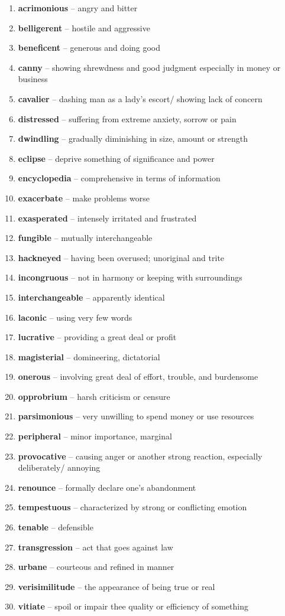 \begin{enumerate}[wide,labelindent=0pt]
\item \textbf{acrimonious} -- angry and bitter
\item \textbf{belligerent} -- hostile and aggressive
\item \textbf{beneficent} -- generous and doing good
\item \textbf{canny} -- showing shrewdness and good judgment especially in money or business
\item \textbf{cavalier} -- dashing man as a lady's escort/ showing lack of concern
\item \textbf{distressed} -- suffering from extreme anxiety, sorrow or pain
\item \textbf{dwindling} -- gradually diminishing in size, amount or strength
\item \textbf{eclipse} -- deprive something of significance and power
\item \textbf{encyclopedia} -- comprehensive in terms of information
\item \textbf{exacerbate} -- make problems worse
\item \textbf{exasperated} -- intensely irritated and frustrated
\item \textbf{fungible} -- mutually interchangeable
\item \textbf{hackneyed} -- having been overused; unoriginal and trite
\item \textbf{incongruous} -- not in harmony or keeping with surroundings
\item \textbf{interchangeable} -- apparently identical
\item \textbf{laconic} -- using very few words
\item \textbf{lucrative} -- providing a great deal or profit
\item \textbf{magisterial} -- domineering, dictatorial
\item \textbf{onerous} -- involving great deal of effort, trouble, and burdensome
\item \textbf{opprobrium} -- harsh criticism or censure
\item \textbf{parsimonious} -- very unwilling to spend money or use resources
\item \textbf{peripheral} -- minor importance, marginal
\item \textbf{provocative} -- causing anger or another strong reaction, especially deliberately/ annoying
\item \textbf{renounce} -- formally declare one's abandonment
\item \textbf{tempestuous} -- characterized by strong or conflicting emotion
\item \textbf{tenable} -- defensible
\item \textbf{transgression} -- act that goes against law
\item \textbf{urbane} -- courteous and refined in manner
\item \textbf{verisimilitude} -- the appearance of being true or real
\item \textbf{vitiate} -- spoil or impair thee quality or efficiency of something
\end{enumerate}

